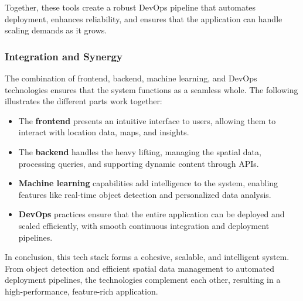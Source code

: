 Together, these tools create a robust DevOps pipeline that automates deployment, enhances reliability, and ensures that the application can handle scaling demands as it grows.

\subsubsection{Integration and Synergy}

The combination of frontend, backend, machine learning, and DevOps technologies ensures that the system functions as a seamless whole. The following illustrates the different parts work together:

\begin{itemize}
    \item{} The \textbf{frontend} presents an intuitive interface to users, allowing them to interact with location data, maps, and insights.
    \item{} The \textbf{backend} handles the heavy lifting, managing the spatial data, processing queries, and supporting dynamic content through APIs.
    \item{} \textbf{Machine learning} capabilities add intelligence to the system, enabling features like real{-}time object detection and personalized data analysis.
    \item{} \textbf{DevOps} practices ensure that the entire application can be deployed and scaled efficiently, with smooth continuous integration and deployment pipelines.
\end{itemize}

In conclusion, this tech stack forms a cohesive, scalable, and intelligent system. From object detection and efficient spatial data management to automated deployment pipelines, the technologies complement each other, resulting in a high{-}performance, feature{-}rich application.

\newpage{}